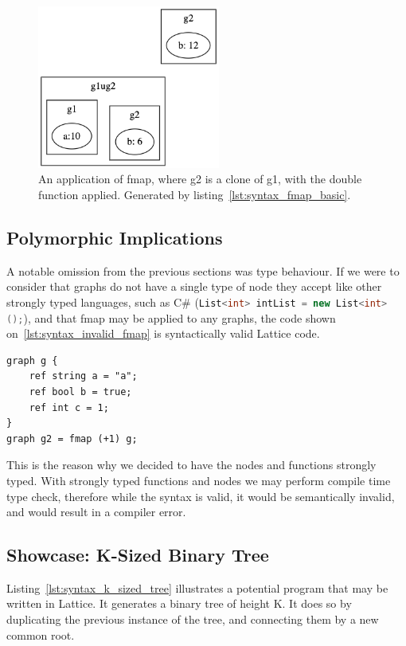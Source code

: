 \begin{figure}[H]
    \centering
    \includegraphics[width=6cm]{figures/syntax_section/syntax_ref_vs_clone_graphs}
    \caption{An application of fmap, where g2 is a clone of g1, with the double function applied. Generated by listing~\ref{lst:syntax_fmap_basic}.}
    \label{fig:syntax_fmap_basic}
\end{figure}


\subsection{Polymorphic Implications}\label{subsec:syntax_polymorphic_implications}
A notable omission from the previous sections was type behaviour.
If we were to consider that graphs do not have a single
type of node they accept like other strongly typed languages, such as C\# (\lstinline[language=C#]{List<int> intList = new List<int>();}),
and that fmap may be applied to any graphs, the code shown on~\ref{lst:syntax_invalid_fmap} is syntactically valid Lattice code.

\begin{lstlisting}[caption={Fmap applied on a graph that contains non-numeric values.},captionpos=b,label={lst:syntax_invalid_fmap}]
graph g {
    ref string a = "a";
    ref bool b = true;
    ref int c = 1;
}
graph g2 = fmap (+1) g;
\end{lstlisting}


This is the reason why we decided to have the nodes and functions strongly typed.
With strongly typed functions and nodes we may perform compile time type check, therefore while the syntax is valid,
it would be semantically invalid, and would result in a compiler error.


\subsection{Showcase: K-Sized Binary Tree}\label{subsec:syntax_showcase_k_sized_binary_tree}
Listing~\ref{lst:syntax_k_sized_tree} illustrates a potential program that may be written in Lattice.
It generates a binary tree of height K.
It does so by duplicating the previous instance of the tree, and connecting them by a new common root.

